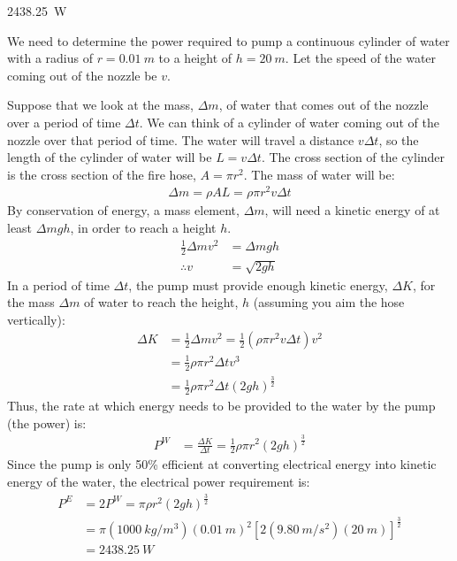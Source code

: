 \begin{finalanswer}
\SI{2438.25}{W}
\end{finalanswer}
\begin{solution}
We need to determine the power required to pump a continuous cylinder of water with a radius of $r=\SI{0.01}{m}$ to a height of $h=\SI{20}{m}$. Let the speed of the water coming out of the nozzle be $v$.

Suppose that we look at the mass, $\Delta m$, of water that comes out of the nozzle over a period of time $\Delta t$. We can think of a cylinder of water coming out of the nozzle over that period of time. The water will travel a distance $v\Delta t$, so the length of the cylinder of water will be $L=v\Delta t$. The cross section of the cylinder is the cross section of the fire hose, $A=\pi r^2$. The mass of water will be:
\begin{align*}
\Delta m = \rho AL=\rho \pi r^2 v\Delta t
\end{align*}
By conservation of energy, a mass element, $\Delta m$, will need a kinetic energy of at least $\Delta m gh$, in order to reach a height $h$. 
\begin{align*}
\frac{1}{2}\Delta mv^2 &= \Delta m gh \\
\therefore v&=\sqrt{2gh}
\end{align*}
In a period of time $\Delta t$, the pump must provide enough kinetic energy, $\Delta K$, for the mass $\Delta m$ of water to reach the height, $h$ (assuming you aim the hose vertically):
\begin{align*}
\Delta K&=\frac{1}{2}\Delta m v^2 = \frac{1}{2} (\rho \pi r^2 v\Delta t) v^2\\
&=\frac{1}{2} \rho \pi r^2 \Delta t v^3\\
&=\frac{1}{2} \rho \pi r^2 \Delta t (2gh)^{\frac{3}{2}}
\end{align*}
Thus, the rate at which energy needs to be provided to the water by the pump (the power) is:
\begin{align*}
P^W&=\frac{\Delta K}{\Delta t}=\frac{1}{2} \rho \pi r^2 (2gh)^{\frac{3}{2}}
\end{align*}
Since the pump is only 50\% efficient at converting electrical energy into kinetic energy of the water, the electrical power requirement is:
\begin{align*}
P^E&=2P^W=\pi\rho  r^2 (2gh)^{\frac{3}{2}}\\
&=\pi(\SI{1000}{kg/m^3})(\SI{0.01}{m})^2[2(\SI{9.80}{m/s^2})(\SI{20}{m})]^{\frac{3}{2}}\\
&=\SI{2438.25}{W}
\end{align*}

\end{solution}


